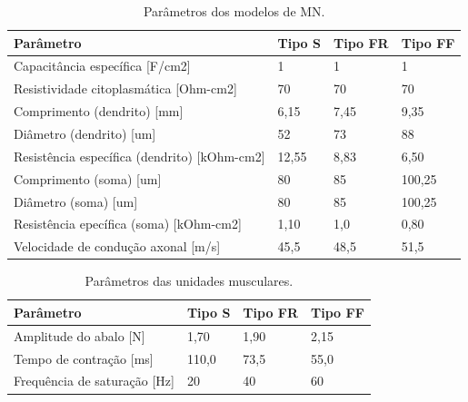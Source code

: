 \begin{table}[h]
 \caption{Parâmetros dos modelos de MN.}
  \centering
  \begin{tabularx}{\columnwidth}{Xlll}
    \toprule
    Parâmetro     & Tipo S     & Tipo FR     & Tipo FF   \\
    \midrule
    Capacitância específica [F/cm2] & 1 & 1 & 1    \\
    Resistividade citoplasmática [Ohm-cm2] & 70 & 70 & 70 \\
    Comprimento (dendrito) [mm] & 6,15 & 7,45 & 9,35 \\
    Diâmetro (dendrito) [um] & 52 & 73 & 88 \\
    Resistência específica (dendrito) [kOhm-cm2] & 12,55 & 8,83 & 6,50 \\
    Comprimento (soma) [um] & 80 & 85 & 100,25 \\
    Diâmetro (soma) [um] & 80 & 85 & 100,25 \\
    Resistência epecífica (soma) [kOhm-cm2] & 1,10 & 1,0 & 0,80 \\
    Velocidade de condução axonal [m/s] & 45,5 & 48,5 & 51,5 \\
    \bottomrule
  \end{tabularx}
  \label{tab:table}
\end{table}


\begin{table}[h]
 \caption{Parâmetros das unidades musculares.}
  \centering
  \begin{tabular}{llll}
    \toprule
    Parâmetro     & Tipo S     & Tipo FR     & Tipo FF   \\
    \midrule
    Amplitude do abalo [N] & 1,70 & 1,90 & 2,15 \\
    Tempo de contração [ms] & 110,0 & 73,5 & 55,0 \\
    Frequência de saturação [Hz] & 20 & 40 & 60 \\
    \bottomrule
  \end{tabular}
  \label{tab:table}
\end{table}

